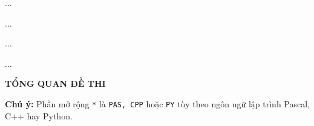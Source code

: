 \providecommand{\TotalProblemCount}{0}

\noindent
\begin{minipage}[t][2.25cm][t]{0.40\textwidth}
    \centering
    ...\par
    \vspace{4pt}
    ...
\end{minipage}
\hfill
\begin{minipage}[t][2.25cm][t]{0.58\textwidth}
    \centering
    ...\par
    \vspace{4pt}
    ...
\end{minipage}

\vspace{0.6cm}

\begin{center}
\fontsize{14}{22} \textbf{TỔNG QUAN ĐỀ THI}
\end{center}

\begin{center}
\setlength{\fboxsep}{6pt}
\setlength{\fboxrule}{0.4pt}

\textbf{Chú ý:} Phần mở rộng \texttt{*} là \texttt{PAS, CPP} hoặc \texttt{PY} tùy theo ngôn ngữ lập trình Pascal, C++ hay Python.


\end{center}

